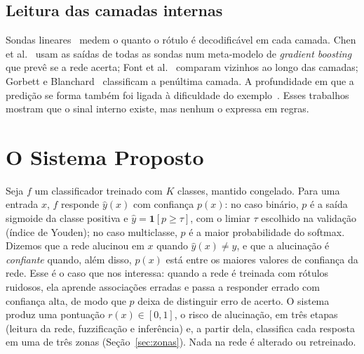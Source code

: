 \documentclass[conference,a4paper]{IEEEtran}
\begin{document}
\subsection{Leitura das camadas internas}
Sondas lineares~\cite{alain2016} medem o quanto o rótulo é decodificável em cada camada. Chen et al.~\cite{chen2019} usam as saídas de todas
as sondas num meta-modelo de \textit{gradient boosting} que prevê se a rede acerta; Font et al.~\cite{font2025} comparam vizinhos ao longo
das camadas; Gorbett e Blanchard~\cite{gorbett2022} classificam a penúltima camada. A profundidade em que a predição se forma também foi
ligada à dificuldade do exemplo~\cite{baldock2021}. Esses trabalhos mostram que o sinal interno existe, mas nenhum o expressa em regras.


\section{O Sistema Proposto}

Seja $f$ um classificador treinado com $K$ classes, mantido congelado. Para uma entrada $x$, $f$ responde $\hat y(x)$ com confiança $p(x)$:
no caso binário, $p$ é a saída sigmoide da classe positiva e $\hat y = \mathbf{1}[p \ge \tau]$, com o limiar $\tau$ escolhido na validação
(índice de Youden); no caso multiclasse, $p$ é a maior probabilidade do softmax. Dizemos que a rede alucinou em $x$ quando $\hat y(x) \ne y$, e que a alucinação é \emph{confiante} quando, além disso, $p(x)$ está entre os
maiores valores de confiança da rede. Esse é o caso que nos interessa: quando a rede é treinada com rótulos ruidosos, ela aprende
associações erradas e passa a responder errado com confiança alta, de modo que $p$ deixa de distinguir erro de acerto.
O sistema produz uma pontuação $r(x) \in [0,1]$, o risco de alucinação, em três etapas (leitura da rede, fuzzificação e inferência)
e, a partir dela, classifica cada resposta em uma de três zonas (Seção~\ref{sec:zonas}). Nada na rede é alterado ou retreinado.
\end{document}
